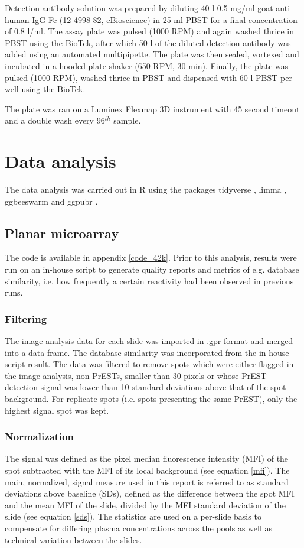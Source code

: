 \documentclass{article}
\begin{document}
Detection antibody solution was prepared by diluting 40 \textmu l 0.5 mg/ml goat anti-human IgG Fc (12-4998-82, eBioscience) in 25 ml PBST for a final concentration of 0.8 \textmu l/ml. The assay plate was pulsed (1000 RPM) and again washed thrice in PBST using the BioTek, after which 50 \textmu l of the diluted detection antibody was added using an automated multipipette. The plate was then sealed, vortexed and incubated in a hooded plate shaker (650 RPM, 30 min). Finally, the plate was pulsed (1000 RPM), washed thrice in PBST and dispensed with 60 \textmu l PBST per well using the BioTek.

The plate was ran on a Luminex Flexmap 3D instrument with 45 second timeout and a double wash every 96$^{th}$ sample.

\section{Data analysis}
 The data analysis was carried out in R \cite{R} using the packages tidyverse \cite{tidyverse}, limma \cite{limma}, ggbeeswarm \cite{ggbeeswarm} and ggpubr \cite{ggpubr}. 
 
\subsection{Planar microarray}\label{data_planar}
The code is available in appendix \ref{code_42k}. Prior to this analysis, results were run on an in-house script to generate quality reports and metrics of e.g. database similarity, i.e. how frequently a certain reactivity had been observed in previous runs.

\subsubsection{Filtering}
The image analysis data for each slide was imported in .gpr-format and merged into a data frame. The database similarity was incorporated from the in-house script result. The data was filtered to remove spots which were either flagged in the image analysis, non-PrESTs, smaller than 30 pixels or whose PrEST detection signal was lower than 10 standard deviations above that of the spot background. For replicate spots (i.e. spots presenting the same PrEST), only the highest signal spot was kept.

\subsubsection{Normalization}
The signal was defined as the pixel median fluorescence intensity (MFI) of the spot subtracted with the MFI of its local background (see equation \ref{mfi}). The main, normalized, signal measure used in this report is referred to as standard deviations above baseline (SDs), defined as the difference between the spot MFI and the mean MFI of the slide, divided by the MFI standard deviation of the slide (see equation \ref{sds}). The statistics are used on a per-slide basis to compensate for differing plasma concentrations across the pools as well as technical variation between the slides.
\end{document}
